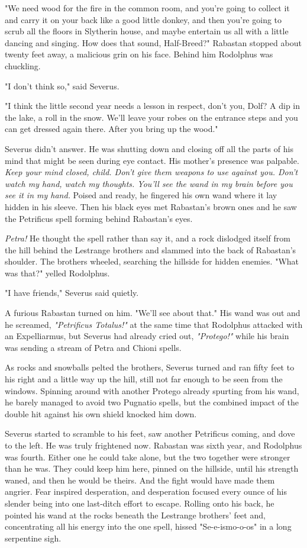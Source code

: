 \documentclass[a4paper,11pt]{article}
\begin{document}
"We need wood for the fire in the common room, and you're going to collect it and carry it on your back like a good little donkey, and then you're going to scrub all the floors in Slytherin house, and maybe entertain us all with a little dancing and singing. How does that sound, Half-Breed?" Rabastan stopped about twenty feet away, a malicious grin on his face. Behind him Rodolphus was chuckling.

"I don't think so," said Severus.

"I think the little second year needs a lesson in respect, don't you, Dolf? A dip in the lake, a roll in the snow. We'll leave your robes on the entrance steps and you can get dressed again there. After you bring up the wood."

Severus didn't answer. He was shutting down and closing off all the parts of his mind that might be seen during eye contact. His mother's presence was palpable. \emph{Keep your mind closed, child. Don't give them weapons to use against you. Don't watch my hand, watch my thoughts. You'll see the wand in my brain before you see it in my hand.} Poised and ready, he fingered his own wand where it lay hidden in his sleeve. Then his black eyes met Rabastan's brown ones and he saw the Petrificus spell forming behind Rabastan's eyes.

\emph{Petra!} He thought the spell rather than say it, and a rock dislodged itself from the hill behind the Lestrange brothers and slammed into the back of Rabastan's shoulder. The brothers wheeled, searching the hillside for hidden enemies. "What was that?" yelled Rodolphus.

"I have friends," Severus said quietly.

A furious Rabastan turned on him. "We'll see about that." His wand was out and he screamed, \emph{"Petrificus Totalus!"} at the same time that Rodolphus attacked with an Expelliarmus, but Severus had already cried out, \emph{"Protego!"} while his brain was sending a stream of Petra and Chioni spells.

As rocks and snowballs pelted the brothers, Severus turned and ran fifty feet to his right and a little way up the hill, still not far enough to be seen from the windows. Spinning around with another Protego already spurting from his wand, he barely managed to avoid two Pugnatio spells, but the combined impact of the double hit against his own shield knocked him down.

Severus started to scramble to his feet, saw another Petrificus coming, and dove to the left. He was truly frightened now. Rabastan was sixth year, and Rodolphus was fourth. Either one he could take alone, but the two together were stronger than he was. They could keep him here, pinned on the hillside, until his strength waned, and then he would be theirs. And the fight would have made them angrier. Fear inspired desperation, and desperation focused every ounce of his slender being into one last-ditch effort to escape. Rolling onto his back, he pointed his wand at the rocks beneath the Lestrange brothers' feet and, concentrating all his energy into the one spell, hissed "Se-e-ismo-o-os" in a long serpentine sigh.
\end{document}
